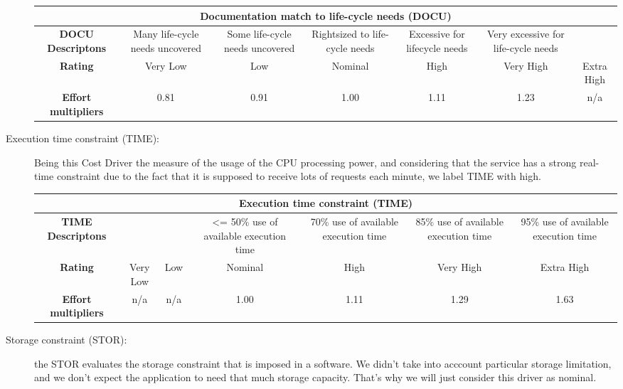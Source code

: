 \begin{description}
\begin{tabular}{ | c | c | c | c | c | c | c | }
\hline
         \multicolumn{7}{|c|}{\textbf{Documentation match to life-cycle needs  (DOCU)}} \\ \hline  \hline
         	\textbf{DOCU Descriptons} &Many life-cycle needs uncovered & Some life-cycle needs uncovered & Rightsized to life-cycle needs &  Excessive for lifecycle needs & Very excessive for life-cycle needs &\\ \hline
	\textbf{Rating}&Very Low & Low & Nominal  & High & Very High &Extra High\\ \hline
	\textbf{Effort multipliers} & 0.81 & 0.91 & 1.00 & 1.11 & 1.23 &  n/a \\ \hline
\end{tabular}

\item[Execution time constraint (TIME):] Being this Cost Driver the measure of the usage of the CPU processing power, and considering that the service has a strong real-time constraint due to the fact that it is supposed to receive lots of requests each minute, we label TIME with high.

\begin{tabular}{ | c | c | c | c | c | c | c | }
\hline
         \multicolumn{7}{|c|}{\textbf{Execution time constraint (TIME)}} \\ \hline  \hline
         	\textbf{TIME Descriptons} & & & <= 50\% use of available execution time& 70\% use of available execution time& 85\% use of available execution time &95\% use of available execution time\\ \hline
	\textbf{Rating}&Very Low & Low & Nominal  & High & Very High &Extra High\\ \hline
	\textbf{Effort multipliers} & n/a & n/a & 1.00 & 1.11 & 1.29 & 1.63 \\ \hline
\end{tabular}

\item[Storage constraint (STOR):] the STOR evaluates the storage constraint that is imposed in a software. We didn't take into acccount particular storage limitation, and we don't expect the application to need that much storage capacity. That's why we will just consider this driver as nominal.


\end{description}

